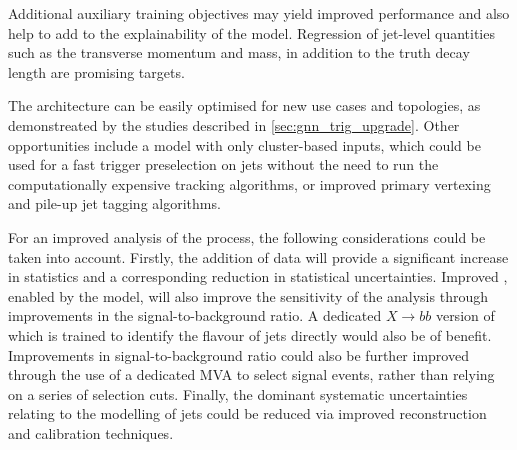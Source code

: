 Additional auxiliary training objectives may yield improved performance and also help to add to the explainability of the model.
Regression of jet-level quantities such as the transverse momentum and mass, in addition to the truth \bhadron decay length are promising targets.

The \GNN architecture can be easily optimised for new use cases and topologies, as demonstreated by the studies described in \cref{sec:gnn_trig_upgrade}.
Other opportunities include a model with only cluster-based inputs, which could be used for a fast trigger preselection on jets without the need to run the computationally expensive tracking algorithms, or improved primary vertexing and pile-up jet tagging algorithms.

For an improved analysis of the \VHbb process, the following considerations could be taken into account.
Firstly, the addition of \runthree data will provide a significant increase in statistics and a corresponding reduction in statistical uncertainties.
Improved \btagging, enabled by the \GNN model, will also improve the sensitivity of the analysis through improvements in the signal-to-background ratio.
A dedicated $X \rightarrow bb$ version of \GNN which is trained to identify the flavour of \largeR jets directly would also be of benefit.
Improvements in signal-to-background ratio could also be further improved through the use of a dedicated MVA to select signal events, rather than relying on a series of selection cuts.
Finally, the dominant systematic uncertainties relating to the modelling of \largeR jets could be reduced via improved reconstruction and calibration techniques.
